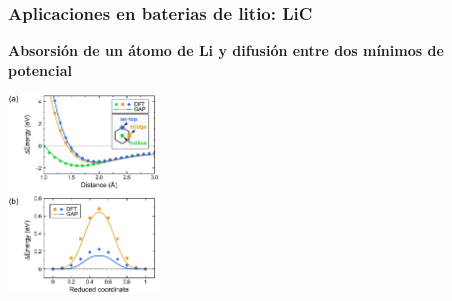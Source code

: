 \documentclass[aspectratio=169]{beamer}
\let\oldtextbf\textbf
\renewcommand{\textbf}[1]{\textcolor{nordblue}{\oldtextbf{#1}}}
\begin{document}
    \begin{frame}
        \frametitle{Aplicaciones en baterias de litio: LiC}

        \textbf{Absorsión de un átomo de Li y difusión entre dos mínimos de 
        potencial}
        
        \begin{center}
            \includegraphics[width=0.3\textwidth]{LiC-sites.png}
        \end{center}
    \end{frame}
    
\end{document}
